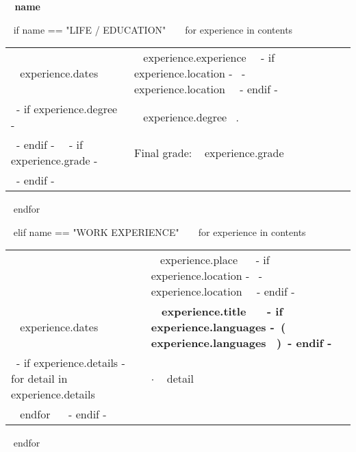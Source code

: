 \medskip

\selectfont

\hspace{-20mm}\colorbox{maincolor}{\begin{minipage}[t][8mm][c]{75mm}
\hspace{20mm}\bfseries \color{white}  ~{{ name }}~
\end{minipage}}
\vspace{6mm}

\begin{minipage}{\textwidth}

~{ if name == "LIFE / EDUCATION" }~
  ~{ for experience in contents }~
    \begin{tabular}{ @{} p{32mm} l @{} }
    {\small ~{{ experience.dates }}~} & {\small ~{{ experience.experience }}~}~{- if experience.location -}~ \small \hspace{1mm}- ~{{ experience.location }}~~{- endif -}~\\
    ~{- if experience.degree -}~
      & \small ~{{ experience.degree }}~.\\
    ~{- endif -}~
    ~{- if experience.grade -}~
      & \small \color{maingrey} Final grade: ~{{ experience.grade }}~\\
    ~{- endif -}~
    \end{tabular}
    \vspace{1mm}
  ~{ endfor }~
  \vspace{2mm}

~{ elif name == "WORK EXPERIENCE" }~
  ~{ for experience in contents }~
    \begin{tabular}{ @{} p{32mm} p{135mm} @{} }
    & \small ~{{ experience.place }}~ ~{- if experience.location -}~ \small \hspace{1mm}- ~{{ experience.location }}~~{- endif -}~\\
    \small ~{{ experience.dates }}~ & \bf\small ~{{ experience.title }}~ ~{- if experience.languages -}~\small\hspace{1mm}\bf\color{maincolor}(~{{ experience.languages }}~)~{- endif -}~\\
    ~{- if experience.details -}~
      ~{ for detail in experience.details }~
        & $\cdot$ \small ~{{ detail }}~ \\
      ~{ endfor }~
    ~{- endif -}~
    \end{tabular}
    \vspace{2mm}
  ~{ endfor }~
  \vspace{20mm}


\end{minipage}
